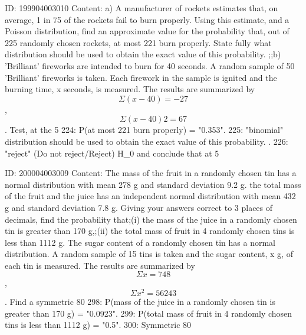 \documentclass{article}
\begin{document}
ID: 199904003010
Content:
a)  A manufacturer of rockets estimates that, on average, 1 in 75 of the rockets fail to burn properly. Using this estimate, and a Poisson distribution, find an approximate value for the probability that, out of 225 randomly chosen rockets, at most 221 burn properly.  State fully what distribution should be used to obtain the exact value of this probability. ;;b)  'Brilliant' fireworks are intended to burn for 40 seconds. A random sample of 50 'Brilliant' fireworks is taken. Each firework in the sample is ignited and the burning time, x seconds, is measured. The results are summarized by $$\Sigma(x-40) = -27$$, $$\Sigma(x-40)2=67$$. Test, at the 5%
224: P(at most 221 burn properly) = "0.353".
225: "binomial" distribution should be used to obtain the exact value of this probability. .
226: "reject" (Do not reject/Reject) H_0 and conclude that at 5%

ID: 200004003009
Content:
The mass of the fruit in a randomly chosen tin has a normal distribution with mean 278 g and standard deviation 9.2 g. the total mass of the fruit and the juice has an independent normal distribution with mean 432 g and standard deviation 7.8 g. Giving your answers correct to 3 places of decimals, find the probability that;(i) the mass of the juice in a randomly chosen tin is greater than 170 g,;(ii) the total mass of fruit in 4 randomly chosen tins is less than 1112 g. The sugar content of a randomly chosen tin has a normal distribution. A random sample of 15 tins is taken and the sugar content, x g, of each tin is measured. The results are summarized by $$\Sigma x= 748$$, $$\Sigma x^2 = 56243$$. Find a symmetric 80%
298: P(mass of the juice in a randomly chosen tin is greater than 170 g) = "0.0923".
299: P(total mass of fruit in 4 randomly chosen tins is less than 1112 g) = "0.5".
300: Symmetric 80%
\end{document}

